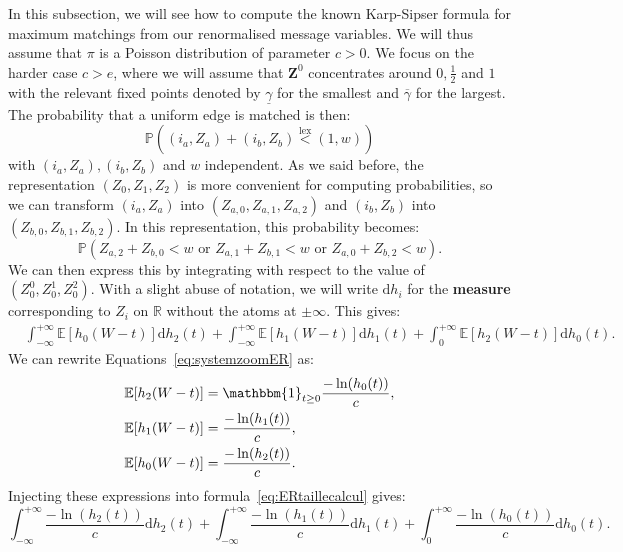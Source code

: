 \documentclass[11pt]{article}
\DeclareMathOperator{\lex}{lex}
\begin{document}
In this subsection, we will see how to compute the known Karp-Sipser formula for maximum matchings from our renormalised message variables. We will thus assume that $\pi$ is a Poisson distribution of parameter $c>0$. We focus on the harder case $c>e$, where we will assume that $\mathbf{Z}^{0}$ concentrates around $0,\frac{1}{2}$ and $1$ with the relevant fixed points denoted by $\underline{\gamma}$ for the smallest and $\overline{\gamma}$ for the largest. The probability that a uniform edge is matched is then:
\begin{equation}
    \mathbb{P}((i_{a},Z_{a})+(i_{b},Z_{b}) \overset{\lex}{<} (1,w))
\end{equation}
with $(i_{a},Z_{a}),(i_{b},Z_{b})$ and $w$ independent.
As we said before, the representation $(Z_0,Z_1,Z_2)$ is more convenient for computing probabilities, so we can transform $(i_a,Z_a)$ into $(Z_{a,0},Z_{a,1},Z_{a,2})$ and $(i_b,Z_b)$ into $(Z_{b,0},Z_{b,1},Z_{b,2})$. In this representation, this probability becomes:
\begin{equation}
    \mathbb{P} (  Z_{a,2}+Z_{b,0} < w \text{ or }Z_{a,1}+Z_{b,1}<w \text{ or } Z_{a,0}+Z_{b,2}<w).
\end{equation}
We can then express this by integrating with respect to the value of $(Z_0^0,Z_0^1,Z_0^2)$. With a slight abuse of notation, we will write $\mathrm{d}h_i$ for the \textbf{measure} corresponding to $Z_i$ on $\mathbb{R}$ without the atoms at $\pm \infty$. This gives:
\begin{equation}\label{eq:ERtaillecalcul}
\begin{aligned}
    &\int_{-\infty}^{+\infty}   \mathbb{E}\left[h_0(W-t)\right] \mathrm{d}h_2(t) + \int_{-\infty}^{+\infty}\mathbb{E}\left[h_{1}(W-t)\right]\mathrm{d}h_{1}(t) + \int_{0}^{+\infty}\mathbb{E}\left[h_{2}(W-t)\right]\mathrm{d}h_0(t).
\end{aligned}
\end{equation}
We can rewrite Equations~\eqref{eq:systemzoomER} as:
\begin{equation*}
\begin{aligned}
    \mathbb{E}[h_{2}(W-t)]&=\mathbbm{1}_{t \geq 0} \frac{-\ln(h_{0}(t))}{c},  \\
    \mathbb{E}[h_{1}(W-t)]&=\frac{-\ln(h_{1}(t))}{c}, \\
    \mathbb{E}[h_{0}(W-t)]&=\frac{-\ln(h_{2}(t))}{c} .
\end{aligned}
\end{equation*}
Injecting these expressions into formula~\eqref{eq:ERtaillecalcul} gives:
\begin{equation}
    \int_{-\infty}^{+\infty}   \frac{-\ln(h_{2}(t))}{c} \mathrm{d}h_2(t) + \int_{-\infty}^{+\infty}\frac{-\ln(h_{1}(t))}{c}\mathrm{d}h_{1}(t) + \int_{0}^{+\infty} \frac{-\ln(h_{0}(t))}{c}\mathrm{d}h_0(t).
\end{equation}
\end{document}
